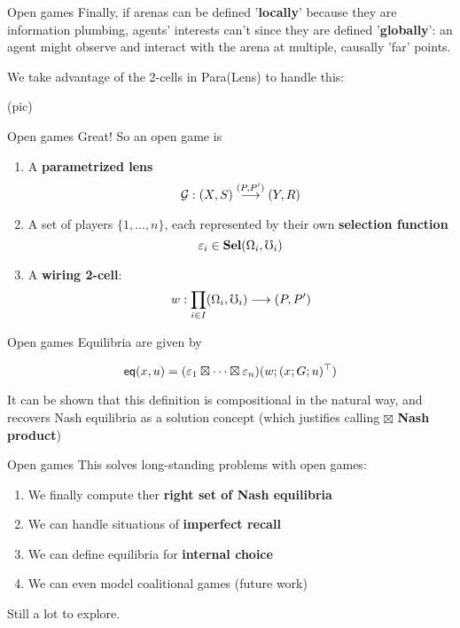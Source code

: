 \begin{frame}{Open games}
	Finally, if arenas can be defined '\textbf{locally}' because they are information plumbing, agents' interests can't since they are defined '\textbf{globally}': an agent might observe and interact with the arena at multiple, causally 'far' points.

	We take advantage of the 2-cells in Para(Lens) to handle this:

	(pic)
\end{frame}

\begin{frame}{Open games}
	Great! So an open game is

	\begin{definition}
		\begin{enumerate}
			\item A \textbf{parametrized lens}
			\begin{equation*}
				\mathcal{G} : (X, S) \overset{(P, P')}{\longrightarrow} (Y,R)
			\end{equation*}
			\item A set of players $\{1, ..., n\}$, each represented by their own \textbf{selection function}
			\begin{equation*}
				\varepsilon_i \in \mathbf{Sel}(\Omega_i, \mho_i)
			\end{equation*}
			\item A \textbf{wiring 2-cell}:
			\begin{equation*}
				w : \prod_{i \in I} (\Omega_i, \mho_i) \longrightarrow (P,P')
			\end{equation*}
		\end{enumerate}
	\end{definition}
\end{frame}

\begin{frame}{Open games}
	Equilibria are given by

	\begin{equation*}
		\mathsf{eq}(x,u) = (\varepsilon_1 \boxtimes \cdots \boxtimes \varepsilon_n)(w ; (x ; G ; u)^\top)
	\end{equation*}

	It can be shown that this definition is compositional in the natural way, and recovers Nash equilibria as a solution concept (which justifies calling $\boxtimes$ \textbf{Nash product})
\end{frame}

\begin{frame}{Open games}
	This solves long-standing problems with open games:

	\begin{enumerate}
		\item We finally compute ther \textbf{right set of Nash equilibria}
		\item We can handle situations of \textbf{imperfect recall}
		\item We can define equilibria for \textbf{internal choice}
		\item We can even model coalitional games (future work)
	\end{enumerate}

	Still a lot to explore.
\end{frame}
